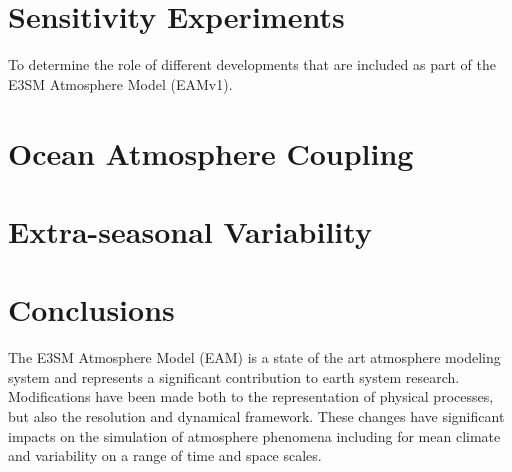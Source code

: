 \documentclass[draft,ms]{AGUTeX}
\begin{document}
\begin{article}
\section {Sensitivity Experiments}
To determine the role of different developments that are included as part of the E3SM Atmosphere Model (EAMv1). 

\section{Ocean Atmosphere Coupling}
\section{Extra-seasonal Variability}
\section{Conclusions}
The E3SM Atmosphere Model (EAM) is a state of the art atmosphere modeling system and represents a significant contribution to earth system research. Modifications have been made both to the representation of physical processes, but also the resolution and dynamical framework. These changes have significant impacts on the simulation of atmosphere phenomena including for mean climate and variability on a range of time and space scales.


%
%
%
%
%
%
%


\end{article}
\end{document}
